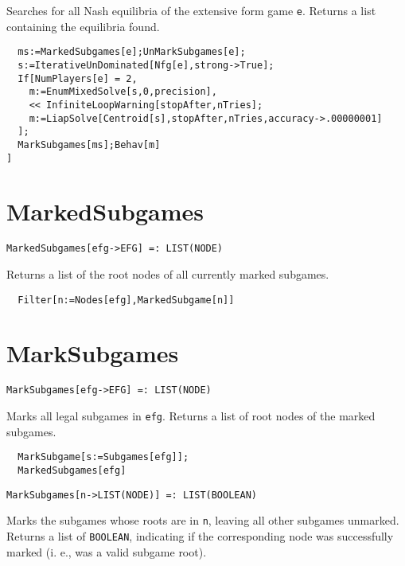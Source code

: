 \noindent
Searches for all Nash equilibria of the extensive form game
\verb+e+.  Returns a list containing the equilibria found.

\udfbody
\begin{verbatim}
  ms:=MarkedSubgames[e];UnMarkSubgames[e];
  s:=IterativeUnDominated[Nfg[e],strong->True];
  If[NumPlayers[e] = 2, 
    m:=EnumMixedSolve[s,0,precision],
    << InfiniteLoopWarning[stopAfter,nTries];
    m:=LiapSolve[Centroid[s],stopAfter,nTries,accuracy->.00000001]
  ];
  MarkSubgames[ms];Behav[m]
]  
\end{verbatim} 


\section*{MarkedSubgames}\label{ExtMarkedSubgames}
\begin{verbatim}
MarkedSubgames[efg->EFG] =: LIST(NODE) 
\end{verbatim}

\noindent
Returns a list of the root nodes of all currently marked subgames.  

\udfbody
\begin{verbatim}
  Filter[n:=Nodes[efg],MarkedSubgame[n]]
\end{verbatim} 


\section*{MarkSubgames}\label{ExtMarkSubgames}
\begin{verbatim}
MarkSubgames[efg->EFG] =: LIST(NODE) 
\end{verbatim}

\noindent
Marks all legal subgames in \verb+efg+.  Returns a list of root nodes
of the marked subgames.  

\udfbody
\begin{verbatim}
  MarkSubgame[s:=Subgames[efg]];
  MarkedSubgames[efg]
\end{verbatim} 

\newsignature

\begin{verbatim}
MarkSubgames[n->LIST(NODE)] =: LIST(BOOLEAN) 
\end{verbatim}

\noindent
Marks the subgames whose roots are in \verb+n+, leaving all other
subgames unmarked.  Returns a list of \verb+BOOLEAN+, indicating if
the corresponding node was successfully marked (i. e., was a valid
subgame root).

